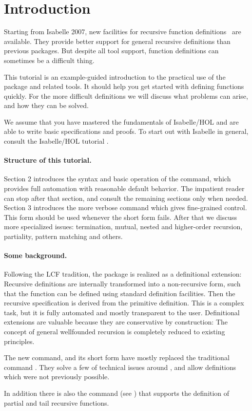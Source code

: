 \section{Introduction}

Starting from Isabelle 2007, new facilities for recursive
function definitions~\cite{krauss2006} are available. They provide
better support for general recursive definitions than previous
packages.  But despite all tool support, function definitions can
sometimes be a difficult thing. 

This tutorial is an example-guided introduction to the practical use
of the package and related tools. It should help you get started with
defining functions quickly. For the more difficult definitions we will
discuss what problems can arise, and how they can be solved.

We assume that you have mastered the fundamentals of Isabelle/HOL
and are able to write basic specifications and proofs. To start out
with Isabelle in general, consult the Isabelle/HOL tutorial
\cite{isa-tutorial}.



\paragraph{Structure of this tutorial.}
Section 2 introduces the syntax and basic operation of the 
command, which provides full automation with reasonable default
behavior.  The impatient reader can stop after that
section, and consult the remaining sections only when needed.
Section 3 introduces the more verbose  command which
gives fine-grained control. This form should be used
whenever the short form fails.
After that we discuss more specialized issues:
termination, mutual, nested and higher-order recursion, partiality, pattern matching
and others.


\paragraph{Some background.}
Following the LCF tradition, the package is realized as a definitional
extension: Recursive definitions are internally transformed into a
non-recursive form, such that the function can be defined using
standard definition facilities. Then the recursive specification is
derived from the primitive definition.  This is a complex task, but it
is fully automated and mostly transparent to the user. Definitional
extensions are valuable because they are conservative by construction:
The  concept of general wellfounded recursion is completely reduced
to existing principles.




The new  command, and its short form  have mostly
replaced the traditional  command \cite{slind-tfl}. They solve
a few of technical issues around , and allow definitions
which were not previously possible.

In addition there is also the  command
(see \cite{isabelle-isar-ref}) that supports the definition of partial
and tail recursive functions.


